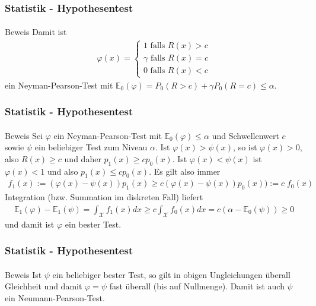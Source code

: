 \documentclass{beamer}
\begin{document}
\begin{frame}
    \frametitle{Statistik - Hypothesentest}
\framesubtitle{}
\begin{block}{Beweis}
Damit ist 
\begin{align*}
 \varphi(x) = \begin{cases} 1 \text{ falls } R(x) > c \\  \gamma  \text{ falls } R(x) = c \\ 0 \text{ falls } R(x) < c  \end{cases}
\end{align*}
ein Neyman-Pearson-Test mit $\mathbb{E}_0(\varphi) = P_0(R > c) + \gamma P_0(R=c) \leq \alpha$.
\end{block}

 \end{frame}



\begin{frame}
    \frametitle{Statistik - Hypothesentest}
\framesubtitle{}
\begin{block}{Beweis}
Sei $\varphi$ ein Neyman-Pearson-Test  mit $\mathbb{E}_0(\varphi) \leq \alpha$ und Schwellenwert $c$ sowie $\psi$ ein beliebiger Test zum Niveau $\alpha$. Ist $\varphi(x) > \psi(x)$, so ist $\varphi(x) > 0$, also $R(x) \geq c$ und daher $p_1(x) \geq c p_0(x)$. Ist $\varphi(x) < \psi(x)$ ist $\varphi(x) <1$ und also $p_1(x) \leq c p_0(x)$. Es gilt also immer
\begin{align*}
f_1(x) := (\varphi(x) - \psi(x))p_1(x) \geq c ( \varphi(x) - \psi(x))p_0(x) ) := c \; f_0(x)
\end{align*}
Integration (bzw. Summation im diskreten Fall) liefert
\begin{align*}
\mathbb{E}_1(\varphi) - \mathbb{E}_1(\psi) = \int_{\mathcal{X}} f_1(x) dx \geq c   \int_{\mathcal{X}} f_0(x) dx = c(\alpha -  \mathbb{E}_0(\psi)  ) \geq 0
\end{align*}
und damit ist $\varphi$ ein bester Test.
\end{block}

 \end{frame}

\begin{frame}
    \frametitle{Statistik - Hypothesentest}
\framesubtitle{}
\begin{block}{Beweis}
Ist  $\psi$ ein beliebiger bester Test, so gilt in obigen Ungleichungen überall Gleichheit und damit $\varphi = \psi$ fast überall (bis auf Nullmenge). Damit ist auch $\psi$ ein Neumann-Pearson-Test.
\end{block}

 \end{frame}
\end{document}
